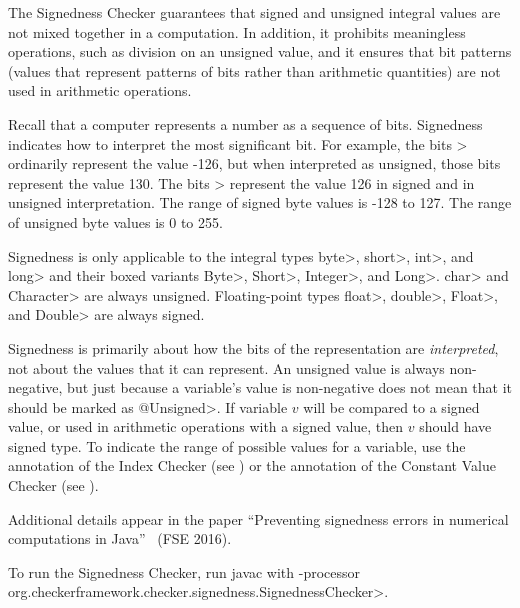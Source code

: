 \htmlhr
{}

The Signedness Checker guarantees that signed and unsigned integral values are not mixed
together in a computation. In addition, it prohibits meaningless operations, such
as division on an unsigned value, and it ensures that bit patterns (values that represent
patterns of bits rather than arithmetic quantities) are not used in arithmetic operations.

Recall that a computer represents a number as a sequence of bits.
Signedness indicates how to interpret the most significant bit.  For
example, the bits > ordinarily represent the value -126, but when
interpreted as unsigned, those bits represent the value 130.  The bits
> represent the value 126 in signed and in unsigned interpretation.
The range of signed byte values is -128 to 127.  The range of unsigned byte
values is 0 to 255.

Signedness is only applicable to the integral types \<byte>,
\<short>, \<int>, and \<long> and their boxed variants \<Byte>,
\<Short>, \<Integer>, and \<Long>.
\<char> and \<Character> are always unsigned.
Floating-point types \<float>, \<double>, \<Float>, and \<Double> are always signed.

Signedness is primarily about how the bits of the representation are
\emph{interpreted}, not about the values that it can represent.  An unsigned value
is always non-negative, but just because a variable's value is non-negative does
not mean that it should be marked as \<@Unsigned>.  If variable $v$ will be
compared to a signed value, or used in arithmetic operations with a signed
value, then $v$ should have signed type.
To indicate the range of possible values for a variable, use the
 annotation of the Index
Checker (see ) or the
 annotation of the Constant Value
Checker (see ).

Additional details appear in the paper
``Preventing signedness errors in numerical computations in
Java''~\cite{Mackie2016} (FSE 2016).

To run the Signedness Checker, run javac with
\<-processor org.checkerframework.checker.signedness.SignednessChecker>.



